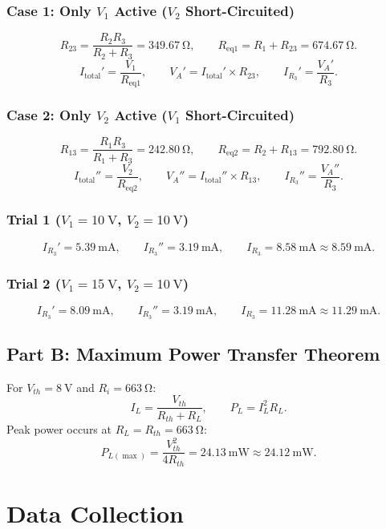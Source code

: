 \subsubsection*{Case 1: Only $V_1$ Active ($V_2$ Short-Circuited)}
\[
R_{23} = \frac{R_2 R_3}{R_2+R_3} = \qty{349.67}{\ohm}, \qquad
R_{\text{eq1}} = R_1+R_{23} = \qty{674.67}{\ohm}.
\]
\[
I_{\text{total}}' = \frac{V_1}{R_{\text{eq1}}}, \qquad V_A' = I_{\text{total}}' \times R_{23}, \qquad I_{R_3}' = \frac{V_A'}{R_3}.
\]

\subsubsection*{Case 2: Only $V_2$ Active ($V_1$ Short-Circuited)}
\[
R_{13} = \frac{R_1 R_3}{R_1+R_3} = \qty{242.80}{\ohm}, \qquad
R_{\text{eq2}} = R_2+R_{13} = \qty{792.80}{\ohm}.
\]
\[
I_{\text{total}}'' = \frac{V_2}{R_{\text{eq2}}}, \qquad V_A'' = I_{\text{total}}'' \times R_{13}, \qquad I_{R_3}'' = \frac{V_A''}{R_3}.
\]

\subsubsection*{Trial 1 ($V_1=\qty{10}{\volt}$, $V_2=\qty{10}{\volt}$)}
\[
I_{R_3}' = \qty{5.39}{\milli\ampere}, \qquad I_{R_3}'' = \qty{3.19}{\milli\ampere}, \qquad I_{R_3} = \qty{8.58}{\milli\ampere} \approx \qty{8.59}{\milli\ampere}.
\]

\subsubsection*{Trial 2 ($V_1=\qty{15}{\volt}$, $V_2=\qty{10}{\volt}$)}
\[
I_{R_3}' = \qty{8.09}{\milli\ampere}, \qquad I_{R_3}'' = \qty{3.19}{\milli\ampere}, \qquad I_{R_3} = \qty{11.28}{\milli\ampere} \approx \qty{11.29}{\milli\ampere}.
\]

\subsection{Part B: Maximum Power Transfer Theorem}
For $V_{th}=\qty{8}{\volt}$ and $R_i=\qty{663}{\ohm}$:
\[
I_L = \frac{V_{th}}{R_{th}+R_L}, \qquad P_L = I_L^2 R_L.
\]
Peak power occurs at $R_L = R_{th} = \qty{663}{\ohm}$:
\[
P_{L(\max)} = \frac{V_{th}^2}{4R_{th}} = \qty{24.13}{\milli\watt} \approx \qty{24.12}{\milli\watt}.
\]

\section{Data Collection}

